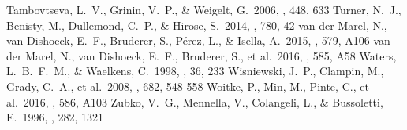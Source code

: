 \documentclass[twocolumn,tighten]{aastex61}
\begin{document}
\begin{thebibliography}{}
 Tambovtseva, L.~V., Grinin, V.~P., \& Weigelt, G.\ 2006, \aap, 448, 633
 Turner, N.~J., Benisty, M., Dullemond, C.~P., \& Hirose, S.\ 2014, \apj, 780, 42
 van der Marel, N., van Dishoeck, E.~F., Bruderer, S., P{\'e}rez, L., \& Isella, A.\ 2015, \aap, 579, A106
 van der Marel, N., van Dishoeck, E.~F., Bruderer, S., et al.\ 2016, \aap, 585, A58
 Waters, L.~B.~F.~M., \& Waelkens, C.\ 1998, \araa, 36, 233
 Wisniewski, J.~P., Clampin, M., Grady, C.~A., et al.\ 2008, \apj, 682, 548-558
 Woitke, P., Min, M., Pinte, C., et al.\ 2016, \aap, 586, A103
 Zubko, V.~G., Mennella, V., Colangeli, L., \& Bussoletti, E.\ 1996, \mnras, 282, 1321

\end{thebibliography}
\end{document}
